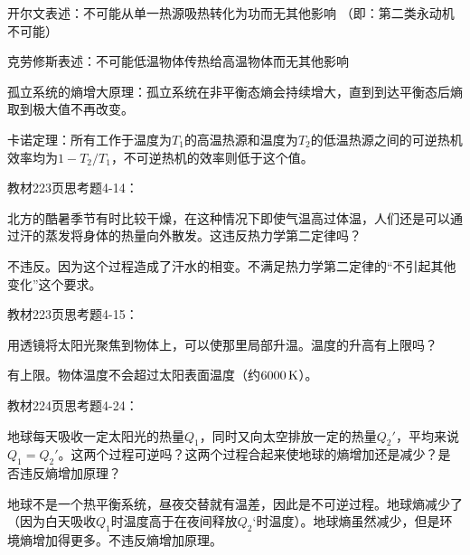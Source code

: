 \documentclass[CJK]{beamer}
\begin{document}
\begin{frame}
  \bch
\bitem
\item{\blue 开尔文表述：不可能从单一热源吸热转化为功而无其他影响 （即：第二类永动机不可能）}
\item{\blue 克劳修斯表述：不可能低温物体传热给高温物体而无其他影响}
\item{孤立系统的熵增大原理：孤立系统在非平衡态熵会持续增大，直到到达平衡态后熵取到极大值不再改变。}
\item{卡诺定理：所有工作于温度为$T_1$的高温热源和温度为$T_2$的低温热源之间的可逆热机效率均为$1-T_2/T_1$，不可逆热机的效率则低于这个值。}
  \eitem
\ech
\end{frame}

\begin{frame}
  \chtitle{\proid (\stwo)}
  \bch
  教材223页思考题4-14：

  北方的酷暑季节有时比较干燥，在这种情况下即使气温高过体温，人们还是可以通过汗的蒸发将身体的热量向外散发。这违反热力学第二定律吗？
  \ech
\end{frame}


\begin{frame}
  \bch
  不违反。因为这个过程造成了汗水的相变。不满足热力学第二定律的“不引起其他变化”这个要求。
  \ech
\end{frame}


\begin{frame}
  \chtitle{\proid (\stwo)}
  \bch
  教材223页思考题4-15：

  用透镜将太阳光聚焦到物体上，可以使那里局部升温。温度的升高有上限吗？
  \ech
\end{frame}


\begin{frame}
  \bch
  有上限。物体温度不会超过太阳表面温度（约$6000\,\mathrm{K}$）。
  \ech
\end{frame}

\begin{frame}
  \chtitle{\proid (\sthree)}
  \bch
  教材224页思考题4-24：

  地球每天吸收一定太阳光的热量$Q_1$，同时又向太空排放一定的热量$Q_2'$，平均来说$Q_1 = Q_2'$。这两个过程可逆吗？这两个过程合起来使地球的熵增加还是减少？是否违反熵增加原理？
  \ech
\end{frame}


\begin{frame}
  \bch
  地球不是一个热平衡系统，昼夜交替就有温差，因此是不可逆过程。地球熵减少了（因为白天吸收$Q_1$时温度高于在夜间释放$Q_2‘$时温度）。地球熵虽然减少，但是环境熵增加得更多。不违反熵增加原理。
  \ech
\end{frame}
\end{document}
